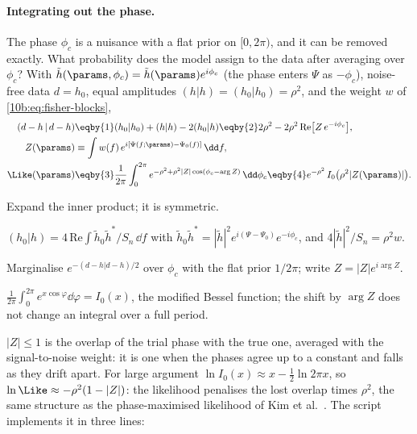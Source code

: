 \paragraph{Integrating out the phase.} The phase $\phi_c$ is a nuisance with a flat prior on $[0,2\pi)$, and it can be
removed exactly. What probability does the model assign to the data after averaging over $\phi_c$? With
$\tilde h(\params,\phi_c)=\tilde h(\params)e^{i\phi_c}$ (the phase enters $\Psi$ as $-\phi_c$), noise-free data $d=h_0$,
equal amplitudes $(h|h)=(h_0|h_0)=\rho^2$, and the weight $w$ of \eqref{10b:eq:fisher-blocks},
\begin{align}
  (d-h\,|\,d-h)&\eqby{1}(h_0|h_0)+(h|h)-2(h_0|h)
  \eqby{2}2\rho^2-2\rho^2\,\mathrm{Re}\big[Z\,e^{-i\phi_c}\big],\nonumber\\
  Z(\params)&\equiv\int w(f)\,e^{i[\Psi(f;\params)-\Psi_0(f)]}\,\dd f,\nonumber\\
  \Like(\params)&\eqby{3}\frac1{2\pi}\int_0^{2\pi}e^{-\rho^2+\rho^2|Z|\cos(\phi_c-\arg Z)}\,\dd\phi_c
  \eqby{4}e^{-\rho^2}\,I_0\big(\rho^2|Z(\params)|\big).
  \label{10b:eq:phase-marg}
\end{align}
\begin{explain}
  \item Expand the inner product; it is symmetric.
  \item $(h_0|h)=4\,\mathrm{Re}\int\tilde h_0\tilde h^*/S_n\,\dd f$ with $\tilde h_0\tilde h^*=|\tilde h|^2e^{i(\Psi-\Psi_0)}e^{-i\phi_c}$, and
        $4|\tilde h|^2/S_n=\rho^2w$.
  \item Marginalise $e^{-(d-h|d-h)/2}$ over $\phi_c$ with the flat prior $1/2\pi$; write $Z=|Z|e^{i\arg Z}$.
  \item $\frac1{2\pi}\int_0^{2\pi}e^{x\cos\varphi}\dd\varphi=I_0(x)$, the modified Bessel function; the shift by $\arg Z$ does not
        change an integral over a full period.
\end{explain}
$\lvert Z\rvert\le1$ is the overlap of the trial phase with the true one, averaged with the signal-to-noise weight: it is
one when the phases agree up to a constant and falls as they drift apart. For large argument
$\ln I_0(x)\approx x-\tfrac12\ln2\pi x$, so $\ln\Like\approx-\rho^2(1-|Z|)$: the likelihood penalises the lost overlap times
$\rho^2$, the same structure as the phase-maximised likelihood of Kim et al.\ \cite[eq.~(53)]{Kim2023}. The script
 implements it in three lines:


